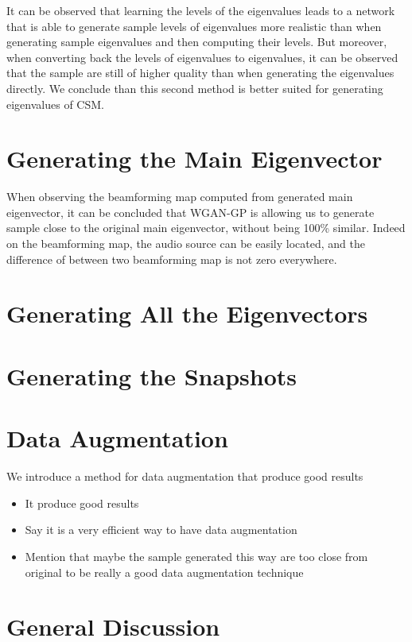\documentclass[11pt,a4paper,twoside]{report}
\begin{document}
It can be observed that learning the levels of the eigenvalues leads to a network that is able to generate sample levels of eigenvalues more realistic than when generating sample eigenvalues and then computing their levels. But moreover, when converting back the levels of eigenvalues to eigenvalues, it can be observed that the sample are still of higher quality than when generating the eigenvalues directly. We conclude than this second method is better suited for generating eigenvalues of CSM.

\section{Generating the Main Eigenvector}

When observing the beamforming map computed from generated main eigenvector, it can be concluded that WGAN-GP is allowing us to generate sample close to the original main eigenvector, without being 100\% similar. Indeed on the beamforming map, the audio source can be easily located, and the difference of between two beamforming map is not zero everywhere.

\section{Generating All the Eigenvectors}

\section{Generating the Snapshots}

\section{Data Augmentation}

We introduce a method for data augmentation that produce good results

\begin{itemize}
    \item It produce good results
    \item Say it is a very efficient way to have data augmentation
    \item Mention that maybe the sample generated this way are too close from original to be really a good data augmentation technique
\end{itemize}



\section{General Discussion}
\end{document}
